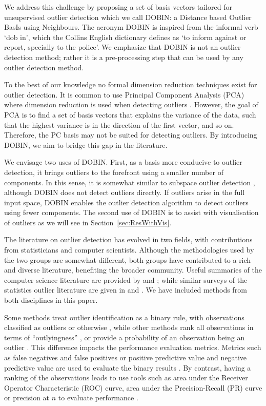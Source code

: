 \documentclass[a4paper,12pt]{article}
\begin{document}
We address this challenge by proposing a set of basis vectors tailored for unsupervised outlier detection which we call DOBIN: a Distance based Outlier BasIs using Neighbours. The acronym DOBIN is inspired from the informal verb `dob in', which the Collins English dictionary defines as `to inform against or report, specially to the police'. We emphasize that DOBIN is not an outlier detection method; rather it is a pre-processing step that can be used by any outlier detection method.

To the best of our knowledge no formal dimension reduction techniques exist for outlier detection. It is common to use Principal Component Analysis (PCA) where dimension reduction is used when detecting outliers \citep[e.g.,][]{talagala2019anomaly, hyndman2015large}. However, the goal of PCA is to find a set of basis vectors that explains the variance of the data, such that the highest variance is in the direction of the first vector, and so on. Therefore, the PC basis may not be suited for detecting outliers. By introducing DOBIN, we aim to bridge this gap in the literature.

We envisage two uses of DOBIN. First, as a basis more conducive to outlier detection, it brings outliers to the forefront using a smaller number of components. In this sense, it is somewhat similar to subspace outlier detection \citep[e.g.,][]{aggarwal2001outlier, keller2012hics}, although DOBIN does not detect outliers directly. If outliers arise in the full input space, DOBIN enables the outlier detection algorithm to detect outliers using fewer components. The second use of DOBIN is to assist with visualisation of outliers as we will see in Section~\ref{sec:ResWithVis}.

The literature on outlier detection has evolved in two fields, with contributions from statisticians and computer scientists. Although the methodologies used by the two groups are somewhat different, both groups have contributed to a rich and diverse literature, benefiting the broader community. Useful summaries of the computer science literature are provided by \citet{goldstein2016comparative} and \citet{zimek2012survey}; while similar surveys of the statistics outlier literature are given in \citet{rousseeuw2005} and \citet{unwin2019multivariate}. We have included methods from both disciplines in this paper.

Some methods treat outlier identification as a binary rule, with observations classified as outliers or otherwise \citep[e.g.,][]{billor2000bacon, wilkinson2017visualizing, rousseeuw2018detecting}, while other methods rank all observations in terms of ``outlyingness'' \citep[e.g.,][]{breunig2000lof, liu2008isolation}, or provide a probability of an observation being an outlier \citep[e.g.,][]{kriegel2009loop}. This difference impacts the performance evaluation metrics. Metrics such as false negatives and false positives or positive predictive value and negative predictive value are used to evaluate the binary results \citep{wilkinson2017visualizing}. By contrast, having a ranking of the observations leads to use tools such as area under the Receiver Operator Characteristic (ROC) curve, area under the Precision-Recall (PR) curve or precision at $n$ to evaluate performance \citep{campos2016evaluation}.
\end{document}
